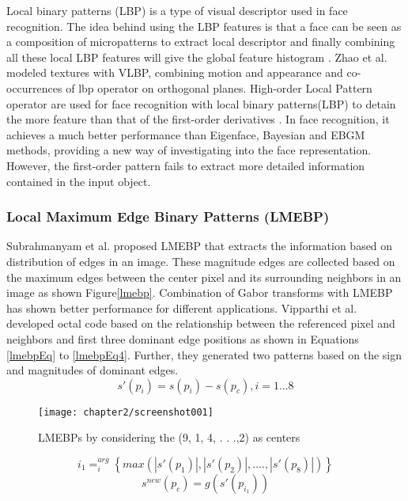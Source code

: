 Local binary patterns (LBP) is a type of visual descriptor used in face recognition. The idea behind using the LBP features is that a face can be seen as a composition of micropatterns  to extract local descriptor and finally combining all these local LBP features will give the global feature histogram \cite{ahonen2006face}. Zhao et al. \cite{zhao2007dynamic} modeled textures with VLBP, combining motion and appearance and co-occurrences of lbp operator on orthogonal planes.  High-order Local Pattern operator are used for face recognition with local binary patterns(LBP) to detain the more feature than that of the first-order derivatives \cite{zhang2009local}. In face recognition, it achieves a much better performance than Eigenface, Bayesian and EBGM methods, providing a new way of investigating into the face representation.  However, the first-order pattern fails to extract more detailed information contained in the input object.



\subsubsection{ Local Maximum Edge Binary Patterns (LMEBP)}
Subrahmanyam et al. \cite{subrahmanyam2012local} proposed LMEBP that extracts the information based on distribution of edges in an image. These magnitude edges are collected based on the maximum edges between the center pixel and its surrounding neighbors in an image as ﻿shown Figure\ref{lmebp}. Combination of Gabor transforms with LMEBP has shown better performance for different applications. Vipparthi et al. \cite{vipparthi2015local} developed octal code based on the relationship between the referenced pixel and neighbors and first three dominant edge positions as shown in Equations \ref{lmebpEq} to \ref{lmebpEq4}. Further, they generated  two patterns based on the sign and magnitudes of dominant edges. 	
\begin{equation}
	s'(p_i)=s(p_i) - s(p_c), i= 1...8 
	\label{lmebpEq}
\end{equation}

\begin{figure}
	\centering
	\texttt{[image: chapter2/screenshot001]}
	\caption{LMEBPs by considering the (9, 1, 4, . . .,2) as centers}
	\label{fig:screenshot001}
\end{figure}
\begin{equation}
	i_1=_i^{arg} \left\{max(|s'(p_1)|, |s'(p_2)|, .... , |s'(p_8)|)\right\}
	\label{lmebpEq2}
\end{equation}
\begin{equation}
s^{new} (p_c) = g(s'(p_{i_1}))  
\label{snew}
\end{equation}

